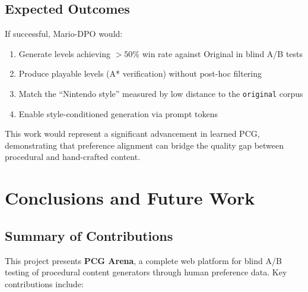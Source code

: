 \documentclass[11pt,a4paper]{article}
\theoremstyle{plain}
\theoremstyle{definition}
\theoremstyle{remark}
\begin{document}
\subsection{Expected Outcomes}
\label{subsec:expected-outcomes}

If successful, Mario-DPO would:
\begin{enumerate}
    \item Generate levels achieving $>50\%$ win rate against Original in blind A/B tests
    \item Produce playable levels (A* verification) without post-hoc filtering
    \item Match the ``Nintendo style'' measured by low distance to the \texttt{original} corpus
    \item Enable style-conditioned generation via prompt tokens
\end{enumerate}

This work would represent a significant advancement in learned PCG, demonstrating that preference alignment can bridge the quality gap between procedural and hand-crafted content.

\section{Conclusions and Future Work}
\label{sec:conclusions}

\subsection{Summary of Contributions}
\label{subsec:contributions}

This project presents \textbf{PCG Arena}, a complete web platform for blind A/B testing of procedural content generators through human preference data. Key contributions include:
\end{document}

